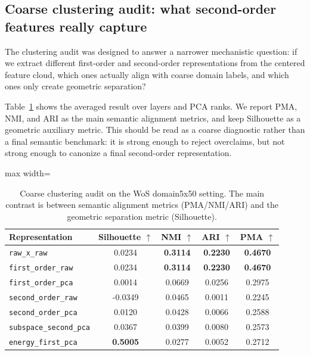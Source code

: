 \documentclass[11pt]{article}
\newcommand{\tablesize}{\footnotesize}
\begin{document}
\subsection{Coarse clustering audit: what second-order features really capture}

The clustering audit was designed to answer a narrower mechanistic question: if we extract different first-order and second-order representations from the centered feature cloud, which ones actually align with coarse domain labels, and which ones only create geometric separation?

Table~\ref{tab:clustering-audit} shows the averaged result over layers and PCA ranks. We report PMA, NMI, and ARI as the main semantic alignment metrics, and keep Silhouette as a geometric auxiliary metric.
This should be read as a coarse diagnostic rather than a final semantic benchmark: it is strong enough to reject overclaims, but not strong enough to canonize a final second-order representation.

\begin{table}[H]
\centering
\tablesize
\begin{adjustbox}{max width=\linewidth}
\begin{tabular}{lcccc}
\toprule
Representation & Silhouette $\uparrow$ & NMI $\uparrow$ & ARI $\uparrow$ & PMA $\uparrow$ \\
\midrule
\texttt{raw\_x\_raw} & 0.0234 & \textbf{0.3114} & \textbf{0.2230} & \textbf{0.4670} \\
\texttt{first\_order\_raw} & 0.0234 & \textbf{0.3114} & \textbf{0.2230} & \textbf{0.4670} \\
\texttt{first\_order\_pca} & 0.0014 & 0.0669 & 0.0256 & 0.2975 \\
\texttt{second\_order\_raw} & -0.0349 & 0.0465 & 0.0011 & 0.2245 \\
\texttt{second\_order\_pca} & 0.0120 & 0.0428 & 0.0066 & 0.2588 \\
\texttt{subspace\_second\_pca} & 0.0367 & 0.0399 & 0.0080 & 0.2573 \\
\texttt{energy\_first\_pca} & \textbf{0.5005} & 0.0277 & 0.0052 & 0.2712 \\
\bottomrule
\end{tabular}
\end{adjustbox}
\caption{Coarse clustering audit on the WoS domain5x50 setting. The main contrast is between semantic alignment metrics (PMA/NMI/ARI) and the geometric separation metric (Silhouette).}
\label{tab:clustering-audit}
\end{table}
\end{document}
